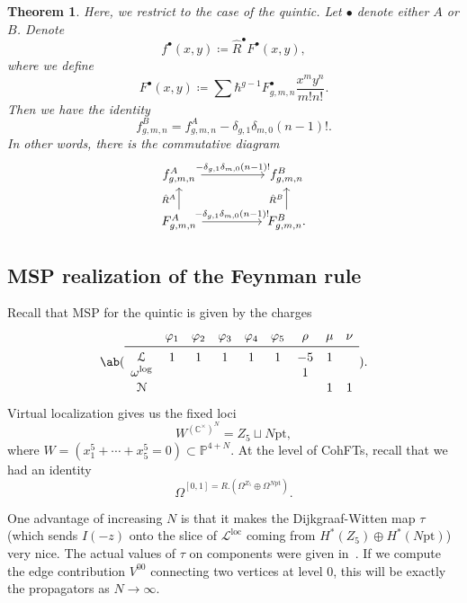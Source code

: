 \documentclass[10pt]{amsart}
\newtheorem{thm}{Theorem}[section]
\theoremstyle{definition}
\theoremstyle{remark}
\theoremstyle{plain}
\theoremstyle{definition}
\theoremstyle{remark}
\newcommand{\C}{\mathbb{C}}
\renewcommand{\P}{\mathbb{P}}
\newcommand{\mc}[1]{\mathcal{#1}}
\newcommand{\mr}[1]{\mathrm{#1}}
\newcommand{\on}[1]{\operatorname{#1}}
\newcommand{\1}{\mathbf{1}}
\newcommand{\2}{\mathbf{2}}
\newcommand{\3}{\mathbf{3}}
\newcommand{\pt}{\mr{pt}}
\begin{document}
\begin{thm}
    Here, we restrict to the case of the quintic. Let $\bullet$ denote either $A$ or $B$. Denote
    \[ f^{\bullet}(x,y) \coloneqq \hat{R}^{\bullet} F^{\bullet}(x,y), \]
    where we define
    \[ F^{\bullet}(x,y) \coloneqq \sum \hbar^{g-1} F_{g,m,n}^{\bullet} \frac{x^m y^n}{m! n!}. \]
    Then we have the identity
    \[ f_{g,m,n}^B = f_{g,m,n}^A - \delta_{g,1} \delta_{m,0} (n-1)!. \]
    In other words, there is the commutative diagram
    \begin{equation*}
    \begin{tikzcd}
        f_{g,m,n}^A \ar{rr}{-\delta_{g,1}\delta_{m,0}(n-1)!} & & f_{g,m,n}^B \\
        F_{g,m,n}^A \ar{rr}{-\delta_{g,1} \delta_{m,0}(n-1)!} \ar{u}{\hat{R}^A} & & F_{g,m,n}^B \ar{u}{\hat{R}^B}.
    \end{tikzcd}
    \end{equation*}
\end{thm}

\subsection{MSP realization of the Feynman rule}%
\label{sub:MSP realization of the Feynman rule}

Recall that MSP for the quintic is given by the charges
\[ \ab(\begin{array}{ccccccccc}
    & \varphi_1 & \varphi_2 & \varphi_3 & \varphi_4 & \varphi_5 & \rho & \mu & \nu \\
    \midrule
    \mc{L} & 1 & 1 & 1 & 1 & 1 & -5 & 1 \\
    \omega^{\log} & & & & & &  1 & &  \\
    \mc{N} & & & & & & & 1 & 1
\end{array}). \]
Virtual localization gives us the fixed loci
\[ W^{(\C^{\times})^N} = Z_5 \sqcup N\pt, \]
where $W = (x_1^5 + \cdots +x_5^5 = 0) \subset \P^{4+N}$. At the level of CohFTs, recall that we had an identity
\[ \Omega^{[0,1] = R . (\Omega^{Z_5} \oplus \Omega^{N\pt})}. \]

One advantage of increasing $N$ is that it makes the Dijkgraaf-Witten map $\tau$ (which sends $I(-z)$ onto the slice of $\mc{L}^{\on{loc}}$ coming from $H^*(Z_5) \oplus H^*(N\pt)$) very nice. The actual values of $\tau$ on components were given in~. If we compute the edge contribution $V^{00}$ connecting two vertices at level $0$, this will be exactly the propagators as $N \to \infty$.
\end{document}

